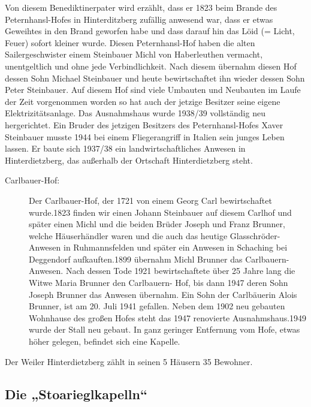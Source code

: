 \documentclass[12pt,a4pager]{book}
\begin{document}
Von diesem Benediktinerpater wird erzählt, dass er 1823 beim Brande des
Peternhansl-Hofes in Hinterditzberg zufällig anwesend war, dass er etwas
Geweihtes in den Brand geworfen habe und dass darauf hin das Löid (= Licht,
Feuer) sofort kleiner wurde. Diesen Peternhansl-Hof haben die alten
Sailergeschwister einem Steinbauer Michl von Haberleuthen vermacht,
unentgeltlich und ohne jede Verbindlichkeit. Nach diesem übernahm diesen Hof
dessen Sohn Michael Steinbauer und heute bewirtschaftet ihn wieder dessen Sohn
Peter Steinbauer. Auf diesem Hof sind viele Umbauten und Neubauten im Laufe der
Zeit vorgenommen worden so hat auch der jetzige Besitzer seine eigene
Elektrizitätsanlage. Das Ausnahmshaus wurde 1938/39 vollständig neu
hergerichtet. Ein Bruder des jetzigen Besitzers des Peternhansl-Hofes Xaver
Steinbauer musste 1944 bei einem Fliegerangriff in Italien sein junges Leben
lassen. Er baute sich 1937/38 ein landwirtschaftliches Anwesen in
Hinterdietzberg, das außerhalb der Ortschaft Hinterdietzberg steht.

\begin{description}
\item[Carlbauer-Hof:] Der Carlbauer-Hof, der 1721 von einem Georg Carl
bewirtschaftet wurde.1823 finden wir einen Johann Steinbauer auf diesem Carlhof
und später einen Michl und die beiden Brüder Joseph und Franz Brunner, welche
Häuserhändler waren und die auch das heutige Glasschröder-Anwesen in
Ruhmannsfelden und später ein Anwesen in Schaching bei Deggendorf
aufkauften.1899 übernahm Michl Brunner das Carlbauern-Anwesen. Nach dessen Tode
1921 bewirtschaftete über 25 Jahre lang die Witwe Maria Brunner den Carlbauern-
Hof, bis dann 1947 deren Sohn Joseph Brunner das Anwesen übernahm. Ein Sohn der
Carlbäuerin Alois Brunner, ist am 20. Juli 1941 gefallen. Neben dem 1902 neu
gebauten Wohnhause des großen Hofes steht das 1947 renovierte Ausnahmshaus.1949
wurde der Stall neu gebaut. In ganz geringer Entfernung vom Hofe, etwas höher
gelegen, befindet sich eine Kapelle.
\end{description}

Der Weiler Hinterdietzberg zählt in seinen 5 Häusern 35 Bewohner.

\subsection{Die „Stoarieglkapelln“}
\end{document}
